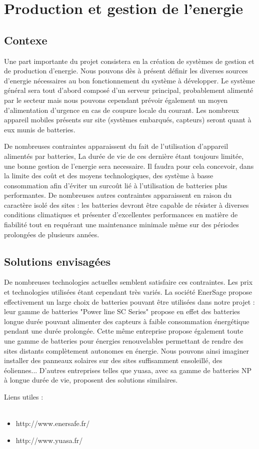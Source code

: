\section {Production et gestion de l'energie}
	\subsection {Contexe}
Une part importante du projet consistera en la création de systèmes de gestion et de production d'energie.
Nous pouvons dès à présent définir les diverses sources d'energie nécessaires au bon fonctionnement du système à développer.
Le système général sera tout d'abord composé d'un serveur principal, probablement alimenté par le secteur mais nous pouvons cependant prévoir également un moyen d'alimentation d'urgence en cas de coupure locale du courant.
Les nombreux appareil mobiles présents sur site (systèmes embarqués, capteurs) seront quant à eux munis de batteries.

De nombreuses contraintes apparaissent du fait de l'utilisation d'appareil alimentés par batteries, La durée de vie de ces dernière étant toujours limitée, une bonne gestion de l'energie sera necessaire. Il faudra pour cela concevoir, dans la limite des coût et des moyens technologiques, des système à basse consommation afin d'éviter un surcoût lié à l'utilisation de batteries plus performantes. De nombreuses autres contraintes apparaissent en raison du caractère isolé des sites : les batteries devront être capable de résister à diverses conditions climatiques et présenter d'excellentes performances en matière de fiabilité tout en requérant une maintenance minimale même sur des périodes prolongées de plusieurs années.


	\subsection {Solutions envisagées}
De nombreuses technologies actuelles semblent satisfaire ces contraintes. Les prix et technologies utilisées étant cependant très variés.
La société EnerSage propose effectivement un large choix de batteries pouvant être utilisées dans notre projet : leur gamme de batteries "Power line SC Series" propose en effet des batteries longue durée pouvant alimenter des capteurs à faible consommation énergétique pendant une durée prolongée. Cette même entreprise propose également toute une gamme de batteries pour énergies renouvelables permettant de rendre des sites distants complètement autonomes en énergie. Nous pouvons ainsi imaginer installer des panneaux solaires sur des sites suffisamment ensoleillé, des éoliennes...
D'autres entreprises telles que yuasa, avec sa gamme de batteries NP à longue durée de vie, proposent des solutions similaires.

Liens utiles : \\~
\begin {itemize}
	\item http://www.enersafe.fr/
	\item http://www.yuasa.fr/
\end {itemize}
